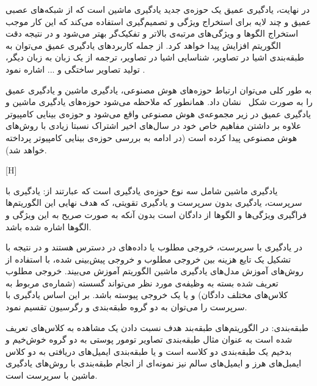 در نهایت، یادگیری عمیق یک حوزه‌ی جدید یادگیری ماشین است که از شبکه‌های عصبی عمیق و چند لایه برای استخراج ویژگی و تصمیم‌گیری استفاده می‌کند که این کار موجب استخراج الگوها و ویژگی‌های مرتبه‌ی بالاتر و تفکیک‌گر بهتر می‌شود و در نتیجه دقت الگوریتم افزایش پیدا خواهد کرد. از جمله کاربرد‌های یادگیری عمیق می‌توان به طبقه‌بندی اشیا در تصاویر، شناسایی اشیا در تصاویر، ترجمه از یک زبان به زبان دیگر، تولید تصاویر ساختگی و ... اشاره نمود . 

به طور کلی می‌توان ارتباط حوزه‌های هوش مصنوعی، یادگیری ماشین و یادگیری عمیق را به صورت شکل~ نشان داد. همانطور که ملاحظه می‌شود حوزه‌های یادگیری ماشین و یادگیری عمیق در زیر مجموعه‌ی هوش مصنوعی واقع می‌شود و حوزه‌ی بینایی کامپیوتر علاوه بر داشتن مفاهیم خاص خود در سال‌های اخیر اشتراک نسبتا زیادی با روش‌های هوش مصنوعی پیدا کرده است (در ادامه به بررسی حوزه‌ی بینایی کامپیوتر پرداخته خواهد شد).

[H]


یادگیری ماشین شامل سه نوع حوزه‌ی یادگیری است که عبارتند از: یادگیری با سرپرست، یادگیری بدون سرپرست و یادگیری تقویتی، که هدف نهایی این الگوریتم‌ها فراگیری ویژگی‌ها و الگوها از دادگان است بدون آنکه به صورت صریح به این ویژگی‌ و الگوها اشاره شده باشد.

در یادگیری با سرپرست، خروجی مطلوب یا داده‌های  در دسترس هستند و در نتیجه با تشکیل یک تایع هزینه بین خروجی مطلوب و خروجی پیش‌بینی شده، با استفاده از روش‌های آموزش مدل‌های یادگیری ماشین الگوریتم آموزش می‌بیند. خروجی مطلوب تعریف شده بسته به وظیفه‌ی مورد نظر می‌تواند گسسته (شماره‌ی مربوط به کلاس‌های مختلف دادگان) و یا یک خروجی پیوسته باشد. بر این اساس یادگیری با سرپرست را می‌توان به دو گروه طبقه‌بندی و رگرسیون تقسیم نمود.

 طبقه‌بندی: در الگوریتم‌های طبقه‌بند هدف نسبت دادن یک مشاهده‌ به کلاس‌های تعریف شده است به عنوان مثال طبقه‌بندی تصاویر تومور پوستی به دو گروه خوش‌خیم و بدخیم یک طبقه‌بندی دو کلاسه است و یا طبقه‌بندی ایمیل‌های دریافتی به دو کلاس‌ ایمبل‌های هرز و ایمیل‌های سالم نیز نمونه‌ای از انجام طبقه‌بندی با روش‌های یادگیری ماشین با سرپرست است.

